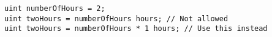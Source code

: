 \begin{lstlisting}[language=Solidity]
uint numberOfHours = 2;
uint twoHours = numberOfHours hours; // Not allowed
uint twoHours = numberOfHours * 1 hours; // Use this instead

\end{lstlisting}